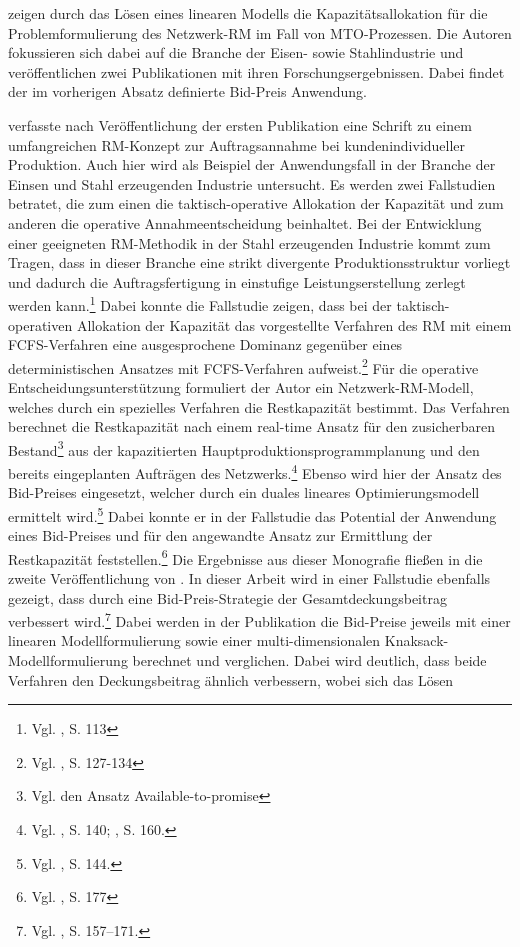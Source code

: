 
\cite{rehkopf:2005aa} zeigen durch das Lösen eines linearen Modells die Kapazitätsallokation für die Problemformulierung des Netzwerk-RM im Fall von MTO-Prozessen. Die Autoren fokussieren sich dabei auf die Branche der Eisen- sowie Stahlindustrie und veröffentlichen zwei Publikationen mit ihren Forschungsergebnissen. Dabei findet der im vorherigen Absatz definierte Bid-Preis Anwendung. 

\cite{rehkopf2007revenue} verfasste nach Veröffentlichung der ersten Publikation eine Schrift zu einem umfangreichen RM-Konzept zur Auftragsannahme bei kundenindividueller Produktion. Auch hier wird als Beispiel der Anwendungsfall in der Branche der Einsen und Stahl erzeugenden Industrie untersucht. Es werden zwei Fallstudien betratet, die zum einen die taktisch-operative Allokation der Kapazität und zum anderen die operative Annahmeentscheidung beinhaltet. Bei der Entwicklung einer geeigneten RM-Methodik in der Stahl erzeugenden Industrie kommt zum Tragen, dass in dieser Branche eine strikt divergente Produktionsstruktur vorliegt und dadurch die Auftragsfertigung in einstufige Leistungserstellung zerlegt werden kann.\footnote{Vgl. \cite{rehkopf2007revenue}, S. 113} Dabei konnte die Fallstudie zeigen, dass bei der taktisch-operativen Allokation der Kapazität das vorgestellte Verfahren des RM mit einem FCFS-Verfahren eine ausgesprochene Dominanz gegenüber eines deterministischen Ansatzes mit FCFS-Verfahren aufweist.\footnote{Vgl. \cite{rehkopf2007revenue}, S. 127-134} Für die operative Entscheidungsunterstützung formuliert der Autor ein Netzwerk-RM-Modell, welches durch ein spezielles Verfahren die Restkapazität bestimmt. Das Verfahren berechnet die Restkapazität nach einem real-time Ansatz für den zusicherbaren Bestand\footnote{Vgl. den Ansatz \glqq Available-to-promise\grqq} aus der kapazitierten Hauptproduktionsprogrammplanung und den bereits eingeplanten Aufträgen des Netzwerks.\footnote{Vgl. \cite{rehkopf2007revenue}, S. 140; \cite{Spengler:2007aa}, S. 160.} Ebenso wird hier der Ansatz des Bid-Preises eingesetzt, welcher durch ein duales lineares Optimierungsmodell ermittelt wird.\footnote{Vgl. \cite{rehkopf2007revenue}, S. 144.} Dabei konnte er in der Fallstudie das Potential der Anwendung eines Bid-Preises und für den angewandte Ansatz zur Ermittlung der Restkapazität feststellen.\footnote{Vgl. \cite{rehkopf2007revenue}, S. 177} Die Ergebnisse aus dieser Monografie fließen in die zweite Veröffentlichung von \cite{Spengler:2007aa}. In dieser Arbeit wird in einer Fallstudie ebenfalls gezeigt, dass durch eine Bid-Preis-Strategie der Gesamtdeckungsbeitrag verbessert wird.\footnote{Vgl. \cite{Spengler:2007aa}, S. 157–171.} Dabei werden in der Publikation die Bid-Preise jeweils mit einer linearen Modellformulierung sowie einer multi-dimensionalen Knaksack-Modell\-for\-mu\-lier\-ung berechnet und verglichen. Dabei wird deutlich, dass beide Verfahren den Deckungsbeitrag ähnlich verbessern, wobei sich das Lösen 